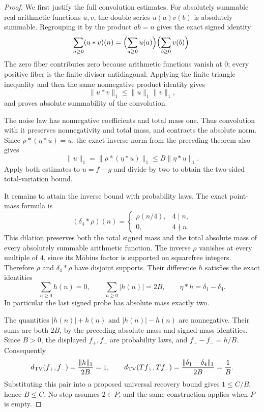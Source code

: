\documentclass[11pt]{article}
\theoremstyle{definition}
\begin{document}
\begin{proof}
We first justify the full convolution estimates.
For absolutely summable real arithmetic functions \(u,v\), the
double series \(u(a)v(b)\) is absolutely summable. Regrouping it by
the product \(ab=n\) gives the exact signed identity
\[
 \sum_{n\ge0}(u*v)(n)
       =\Bigl(\sum_{a\ge0}u(a)\Bigr)
        \Bigl(\sum_{b\ge0}v(b)\Bigr).
\]
The zero fiber contributes zero because arithmetic functions
vanish at \(0\); every positive fiber is the finite divisor
antidiagonal. Applying the finite triangle inequality and then
the same nonnegative product identity gives
\[
 \|u*v\|_1\le\|u\|_1\|v\|_1,
\]
and proves absolute summability of the convolution.

The noise law has nonnegative coefficients and total mass one.
Thus convolution with it preserves nonnegativity and total mass,
and contracts the absolute norm. Since
\(\rho*(\eta*u)=u\), the exact inverse norm from the preceding
theorem also gives
\[
 \|u\|_1
   =\|\rho*(\eta*u)\|_1
   \le B\|\eta*u\|_1.
\]
Apply both estimates to \(u=f-g\) and divide by two to obtain the
two-sided total-variation bound.

It remains to attain the inverse bound with probability laws.
The exact point-mass formula is
\[
 (\delta_4*\rho)(n)=
 \begin{cases}
  \rho(n/4),&4\mid n,\\
  0,&4\nmid n.
 \end{cases}
\]
This dilation preserves both the total signed mass and the total
absolute mass of every absolutely summable arithmetic function.
The inverse \(\rho\) vanishes at every multiple of \(4\), since
its M\"obius factor is supported on squarefree integers.
Therefore \(\rho\) and \(\delta_4*\rho\) have disjoint supports.
Their difference \(h\) satisfies the exact identities
\[
 \sum_{n\ge0}h(n)=0,\qquad
 \sum_{n\ge0}|h(n)|=2B,\qquad
 \eta*h=\delta_1-\delta_4.
\]
In particular the last signed probe has absolute mass exactly two.

The quantities \(|h(n)|+h(n)\) and \(|h(n)|-h(n)\) are
nonnegative. Their sums are both \(2B\), by the preceding
absolute-mass and signed-mass identities. Since \(B>0\), the
displayed \(f_+,f_-\) are probability laws, and
\(f_+-f_-=h/B\). Consequently
\[
 d_{\rm TV}(f_+,f_-)=\frac{\|h\|_1}{2B}=1,\qquad
 d_{\rm TV}(Tf_+,Tf_-)
       =\frac{\|\delta_1-\delta_4\|_1}{2B}=\frac1B.
\]
Substituting this pair into a proposed universal recovery bound
gives \(1\le C/B\), hence \(B\le C\).
No step assumes \(2\in P\), and the same construction applies
when \(P\) is empty.
\end{proof}
\end{document}

